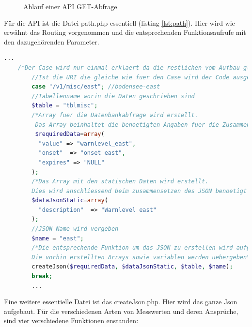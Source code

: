 \begin{figure}[h!]
	\centering
	\caption{Ablauf einer API GET-Abfrage}
	\label{img:APIFiles}
\end{figure}

Für die API ist die Datei path.php essentiell (listing \ref{lst:path}). Hier wird wie erwähnt das Routing vorgenommen und die entsprechenden Funktionsaufrufe mit den dazugehörenden Parameter.  


\begin{lstlisting}[label=lst:path,caption=Beispiel Case zuweisung, language=php, style=php]
	...    
    /*Der Case wird nur einmal erklaert da die restlichen vom Aufbau gleich sind*/
        //Ist die URI die gleiche wie fuer den Case wird der Code ausgefuehrt
        case "/v1/misc/east"; //bodensee-east
        //Tabellenname worin die Daten geschrieben sind
        $table = "tblmisc";
        /*Array fuer die Datenbankabfrage wird erstellt.
         Das Array beinhaltet die benoetigten Angaben fuer die Zusammensetzung*/
         $requiredData=array(
          "value" => "warnlevel_east",
          "onset"  => "onset_east",
          "expires" => "NULL"
        );
        /*Das Array mit den statischen Daten wird erstellt.
        Dies wird anschliessend beim zusammensetzen des JSON benoetigt */
        $dataJsonStatic=array(
          "description"  => "Warnlevel east"
        );
        //JSON Name wird vergeben
        $name = "east";
        /*Die entsprechende Funktion um das JSON zu erstellen wird aufgerufen.
        Die vorhin erstellten Arrays sowie variablen werden uebergeben*/
        createJson($requiredData, $dataJsonStatic, $table, $name);
        break;
        ...
\end{lstlisting}

Eine weitere essentielle Datei ist das createJson.php. Hier wird das ganze Json aufgebaut. Für die verschiedenen Arten von Messwerten und deren Ansprüche, sind vier verschiedene Funktionen enstanden:

